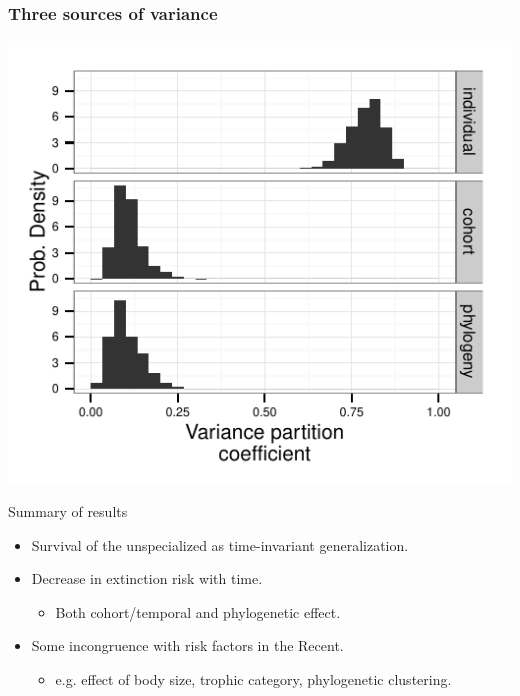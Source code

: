 \documentclass{beamer}
\begin{document}
\begin{frame}
  \frametitle{Three sources of variance}

  \begin{center}
    \includegraphics[height=0.8\textheight,keepaspectratio=true]{figure/variance_est}
  \end{center}

  \footnotesize{}
\end{frame}

\begin{frame}
  \begin{block}{Summary of results}
    \begin{itemize}
      \item Survival of the unspecialized as time-invariant generalization.
      \item Decrease in extinction risk with time.
        \begin{itemize}
          \item Both cohort/temporal and phylogenetic effect.
        \end{itemize}
      \item Some incongruence with risk factors in the Recent.
        \begin{itemize}
          \item e.g. effect of body size, trophic category, phylogenetic clustering.
        \end{itemize}
    \end{itemize}
  \end{block}
\end{frame}
\end{document}
